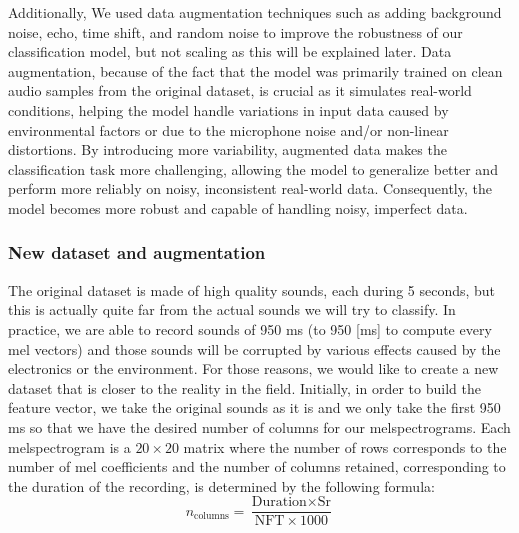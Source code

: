 \documentclass{article}
\begin{document}
Additionally, We used data augmentation techniques such as adding background noise, echo, time shift, and random noise to improve the robustness of our classification model, but not scaling as this will be explained later. Data augmentation, because of the fact that the model was primarily trained on clean audio samples from the original dataset, is crucial as it simulates real-world conditions, helping the model handle variations in input data caused by environmental factors or due to the microphone noise and/or non-linear distortions. By introducing more variability, augmented data makes the classification task more challenging, allowing the model to generalize better and perform more reliably on noisy, inconsistent real-world data. Consequently, the model becomes more robust and capable of handling noisy, imperfect data.
\subsubsection{New dataset and augmentation}

The original dataset is made of high quality sounds, each during 5 seconds, but this is actually quite far from the actual sounds we will try to classify. In practice, we are able to record sounds of 950 ms (to 950 [ms] to compute every mel vectors) and those sounds will be corrupted by various effects caused by the electronics or the environment. For those reasons, we would like to create a new dataset that is closer to the reality in the field. Initially, in order to build the feature vector, we take the original sounds as it is and we only take the first 950 ms so that we have the desired number of columns for our melspectrograms. Each melspectrogram is a $20 \times 20$ matrix where the number of rows corresponds to the number of mel coefficients and the number of columns retained, corresponding to the duration of the recording, is determined by the following formula: 
\begin{equation}
    n_{\text{columns}} = \frac{\text{Duration} \times \text{Sr}}{\text{NFT} \times 1000}
\end{equation}
\end{document}
